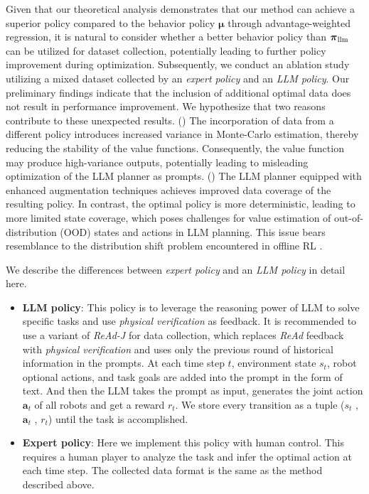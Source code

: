 \documentclass[11pt]{article}
\theoremstyle{plain}
\theoremstyle{remark}
\begin{document}
Given that our theoretical analysis demonstrates that our method can achieve a superior policy compared to the behavior policy $\boldsymbol{\mu}$ through advantage-weighted regression, it is natural to consider whether a better behavior policy than $\boldsymbol{\pi}_{\rm llm}$ can be utilized for dataset collection, potentially leading to further policy improvement during optimization. Subsequently, we conduct an ablation study utilizing a mixed dataset collected by an \emph{expert policy} and an \emph{LLM policy}. Our preliminary findings indicate that the inclusion of additional optimal data does not result in performance improvement. We hypothesize that two reasons contribute to these unexpected results. () The incorporation of data from a different policy introduces increased variance in Monte-Carlo estimation, thereby reducing the stability of the value functions. Consequently, the value function may produce high-variance outputs, potentially leading to misleading optimization of the LLM planner as prompts. () The LLM planner equipped with enhanced augmentation techniques achieves improved data coverage of the resulting policy. In contrast, the optimal policy is more deterministic, leading to more limited state coverage, which poses challenges for value estimation of out-of-distribution (OOD) states and actions in LLM planning. This issue bears resemblance to the distribution shift problem encountered in offline RL \citep{levine2020offline, xie2021bellman}.

We describe the differences between \emph{expert policy} and an \emph{LLM policy} in detail here.
\begin{itemize} [leftmargin=10pt, topsep=0pt,itemsep=1pt,partopsep=1pt, parsep=1pt]
    \item \textbf{LLM policy}: This policy is to leverage the reasoning power of LLM to solve specific tasks and use \emph{physical verification} as feedback. It is recommended to use a variant of \emph{ReAd-J} for data collection, which replaces \emph{ReAd} feedback with \emph{physical verification} and uses only the previous round of historical information in the prompts. At each time step $t$, environment state $s_{t}$, robot optional actions, and task goals are added into the prompt in the form of text. And then the LLM takes the prompt as input, generates the joint action $\boldsymbol{a}_{t}$ of all robots and get a reward $r_{t}$. We store every transition as a tuple ($s_{t}$ , $\boldsymbol{a}_{t}$ , $r_{t}$) until the task is accomplished.
    \item \textbf{Expert policy}: Here we implement this policy with human control. This requires a human player to analyze the task and infer the optimal action at each time step. The collected data format is the same as the method described above.
\end{itemize}
\end{document}
